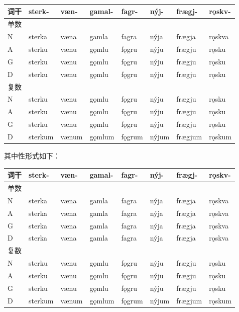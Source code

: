 \begin{longtable}{llllllll}
  \toprule
  词干 & sterk-  & væn-  & gamal- & fagr-  & nýj-  & frægj-  & rǫskv- \\
  \midrule
  \endhead
  \bottomrule
  \endfoot
  单数 &         &       &        &        &       &         &        \\
  N    & sterka  & væna  & gamla  & fagra  & nýja  & frægja  & rǫskva \\
  A    & sterku  & vænu  & gǫmlu  & fǫgru  & nýju  & frægju  & rǫsku  \\
  G    & sterku  & vænu  & gǫmlu  & fǫgru  & nýju  & frægju  & rǫsku  \\
  D    & sterku  & vænu  & gǫmlu  & fǫgru  & nýju  & frægju  & rǫsku  \\
  复数 &         &       &        &        &       &         &        \\
  N    & sterku  & vænu  & gǫmlu  & fǫgru  & nýju  & frægju  & rǫsku  \\
  A    & sterku  & vænu  & gǫmlu  & fǫgru  & nýju  & frægju  & rǫsku  \\
  G    & sterku  & vænu  & gǫmlu  & fǫgru  & nýju  & frægju  & rǫsku  \\
  D    & sterkum & vænum & gǫmlum & fǫgrum & nýjum & frægjum & rǫskum \\
\end{longtable}

其中性形式如下：

\begin{longtable}{llllllll}
  \toprule
  词干 & sterk-  & væn-  & gamal- & fagr-  & nýj-  & frægj-  & rǫskv- \\
  \midrule
  \endhead
  \bottomrule
  \endfoot
  单数 &         &       &        &        &       &         &        \\
  N    & sterka  & væna  & gamla  & fagra  & nýja  & frægja  & rǫskva \\
  A    & sterka  & væna  & gamla  & fagra  & nýja  & frægja  & rǫskva \\
  G    & sterka  & væna  & gamla  & fagra  & nýja  & frægja  & rǫskva \\
  D    & sterka  & væna  & gamla  & fagra  & nýja  & frægja  & rǫskva \\
  复数 &         &       &        &        &       &         &        \\
  N    & sterku  & vænu  & gǫmlu  & fǫgru  & nýju  & frægju  & rǫsku  \\
  A    & sterku  & vænu  & gǫmlu  & fǫgru  & nýju  & frægju  & rǫsku  \\
  G    & sterku  & vænu  & gǫmlu  & fǫgru  & nýju  & frægju  & rǫsku  \\
  D    & sterkum & vænum & gǫmlum & fǫgrum & nýjum & frægjum & rǫskum \\
\end{longtable}

